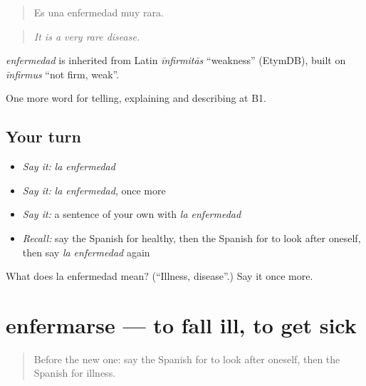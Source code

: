 \begin{quote}
Es una enfermedad muy rara.
\end{quote}

\begin{quote}
\emph{It is a very rare disease.}
\end{quote}

\begin{cousinweb}
\emph{enfermedad} is inherited from Latin \emph{īnfirmitās} \textquotedblleft{}weakness\textquotedblright{} (EtymDB), built on \emph{īnfirmus} \textquotedblleft{}not firm, weak\textquotedblright{}.
\end{cousinweb}

\begin{grammarlens}[title={What you've built}]
One more word for telling, explaining and describing at B1.
\end{grammarlens}

\subsection*{Your turn}
\begin{itemize}
\raggedright
  \item \emph{Say it:} \emph{la enfermedad}
  \item \emph{Say it:} \emph{la enfermedad}, once more
  \item \emph{Say it:} a sentence of your own with \emph{la enfermedad}
  \item \emph{Recall:} say the Spanish for healthy, then the Spanish for to look after oneself, then say \emph{la enfermedad} again
\end{itemize}

\begin{tcolorbox}[breakable,colback=teal!4,colframe=teal!35!black,title={Before you move on}]
What does la enfermedad mean? (\textquotedblleft{}Illness, disease\textquotedblright{}.) Say it once more.
\end{tcolorbox}
\section[enfermarse]{enfermarse — to fall ill, to get sick}

\label{lesson:ES-C732-enfermarse}



\begin{quote}
Before the new one: say the Spanish for to look after oneself, then the Spanish for illness.
\end{quote}

